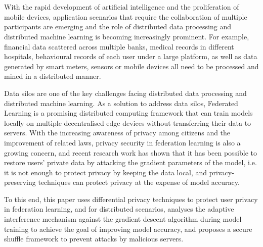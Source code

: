 \newpage
\vspace{-1cm}
\chapter*{}

With the rapid development of artificial intelligence and the proliferation of mobile devices, application scenarios that require the collaboration of multiple participants are emerging and the role of distributed data processing and distributed machine learning is becoming increasingly prominent. For example, financial data scattered across multiple banks, medical records in different hospitals, behavioural records of each user under a large platform, as well as data generated by smart meters, sensors or mobile devices all need to be processed and mined in a distributed manner. 

Data silos are one of the key challenges facing distributed data processing and distributed machine learning. As a solution to address data silos, Federated Learning is a promising distributed computing framework that can train models locally on multiple decentralised edge devices without transferring their data to servers. With the increasing awareness of privacy among citizens and the improvement of related laws, privacy security in federation learning is also a growing concern, and recent research work has shown that it has been possible to restore users' private data by attacking the gradient parameters of the model, i.e. it is not enough to protect privacy by keeping the data local, and privacy-preserving techniques can protect privacy at the expense of model accuracy. 

To this end, this paper uses differential privacy techniques to protect user privacy in federation learning, and for distributed scenarios, analyses the adaptive interference mechanism against the gradient descent algorithm during model training to achieve the goal of improving model accuracy, and proposes a secure shuffle framework to prevent attacks by malicious servers. 

